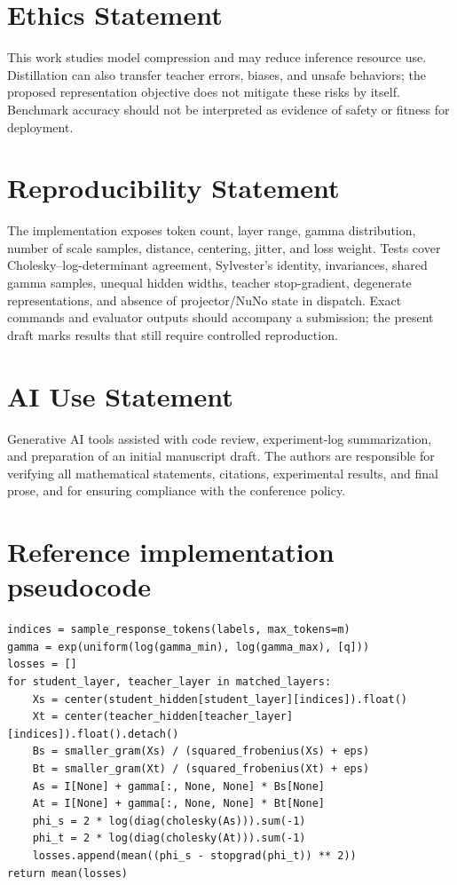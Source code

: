 \documentclass{article}
\begin{document}
\section*{Ethics Statement}
This work studies model compression and may reduce inference resource use.
Distillation can also transfer teacher errors, biases, and unsafe behaviors;
the proposed representation objective does not mitigate these risks by
itself.  Benchmark accuracy should not be interpreted as evidence of safety or
fitness for deployment.

\section*{Reproducibility Statement}
The implementation exposes token count, layer range, gamma distribution,
number of scale samples, distance, centering, jitter, and loss weight.  Tests
cover Cholesky--log-determinant agreement, Sylvester's identity, invariances,
shared gamma samples, unequal hidden widths, teacher stop-gradient, degenerate
representations, and absence of projector/NuNo state in dispatch.  Exact
commands and evaluator outputs should accompany a submission; the present
draft marks results that still require controlled reproduction.

\section*{AI Use Statement}
Generative AI tools assisted with code review, experiment-log summarization,
and preparation of an initial manuscript draft.  The authors are responsible
for verifying all mathematical statements, citations, experimental results,
and final prose, and for ensuring compliance with the conference policy.




\appendix
\section{Reference implementation pseudocode}
\begin{verbatim}
indices = sample_response_tokens(labels, max_tokens=m)
gamma = exp(uniform(log(gamma_min), log(gamma_max), [q]))
losses = []
for student_layer, teacher_layer in matched_layers:
    Xs = center(student_hidden[student_layer][indices]).float()
    Xt = center(teacher_hidden[teacher_layer][indices]).float().detach()
    Bs = smaller_gram(Xs) / (squared_frobenius(Xs) + eps)
    Bt = smaller_gram(Xt) / (squared_frobenius(Xt) + eps)
    As = I[None] + gamma[:, None, None] * Bs[None]
    At = I[None] + gamma[:, None, None] * Bt[None]
    phi_s = 2 * log(diag(cholesky(As))).sum(-1)
    phi_t = 2 * log(diag(cholesky(At))).sum(-1)
    losses.append(mean((phi_s - stopgrad(phi_t)) ** 2))
return mean(losses)
\end{verbatim}
\end{document}
